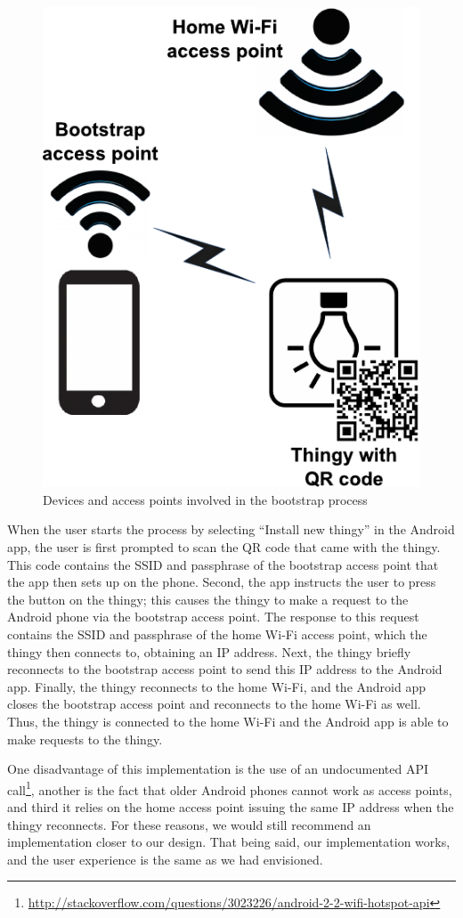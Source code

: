 \documentclass{ubicomp2012}
\begin{document}
\begin{figure}[th]
\begin{center}
\includegraphics[width=0.70\columnwidth]{figures/bootstrap-drawing.pdf}
\end{center}
\caption{Devices and access points involved in the bootstrap process}
\label{fig:bootstrapDraw}
\end{figure}

When the user starts the process by selecting ``Install new thingy'' in the Android app, the user is first prompted to scan the QR code that came with the thingy. This code contains the SSID and passphrase of the bootstrap access point that the app then sets up on the phone. Second, the app instructs the user to press the button on the thingy; this causes the thingy to make a request to the Android phone via the bootstrap access point. The response to this request contains the SSID and passphrase of the home Wi-Fi access point, which the thingy then connects to, obtaining an IP address. Next, the thingy briefly reconnects to the bootstrap access point to send this IP address to the Android app. Finally, the thingy reconnects to the home Wi-Fi, and the Android app closes the bootstrap access point and reconnects to the home Wi-Fi as well. Thus, the thingy is connected to the home Wi-Fi and the Android app is able to make requests to the thingy.

One disadvantage of this implementation is the use of an undocumented API call\footnote{\url{http://stackoverflow.com/questions/3023226/android-2-2-wifi-hotspot-api}}, another is the fact that older Android phones cannot work as access points, and third it relies on the home access point issuing the same IP address when the thingy reconnects. For these reasons, we would still recommend an implementation closer to our design. That being said, our implementation works, and the user experience is the same as we had envisioned.
\end{document}
